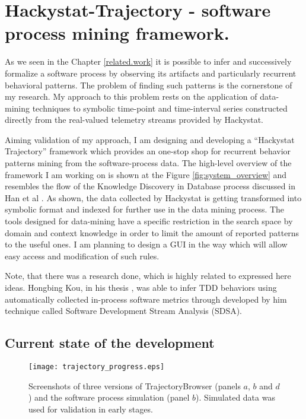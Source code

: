 \chapter{Hackystat-Trajectory - software process mining framework.} \label{trajectory}
As we seen in the Chapter \ref{related.work} it is possible to infer and successively formalize a software process by observing its artifacts and particularly recurrent behavioral patterns. The problem of finding such patterns is the cornerstone of my research. My approach to this problem rests on the application of data-mining techniques to symbolic time-point and time-interval series constructed directly from the real-valued telemetry streams provided by Hackystat.

Aiming validation of my approach, I am designing and developing a ``Hackystat Trajectory'' framework which provides an one-stop shop for recurrent behavior patterns mining from the software-process data. The high-level overview of the framework I am working on is shown at the Figure \ref{fig:system_overview} and resembles the flow of the Knowledge Discovery in Database process discussed in Han et al \cite{citeulike:709476}. As shown, the data collected by Hackystat is getting transformed into symbolic format and indexed for further use in the data mining process. The tools designed for data-mining have a specific restriction in the search space by domain and context knowledge in order to limit the amount of reported patterns to the useful ones. I am planning to design a GUI in the way which will allow easy access and modification of such rules. 

Note, that there was a research done, which is highly related to expressed here ideas. Hongbing Kou, in his thesis \cite{citeulike:2703162}, was able to infer TDD behaviors using automatically collected in-process software metrics through developed by him technique called Software Development Stream Analysis (SDSA).

\section{Current state of the development}

\begin{figure}[tbp]
   \centering
   \texttt{[image: trajectory\_progress.eps]}
   \caption{Screenshots of three versions of TrajectoryBrowser (panels $a$, $b$ and $d$) and the software process simulation (panel $b$). Simulated data was used for validation in early stages.}
   \label{fig:trajectory_progress}
\end{figure}

